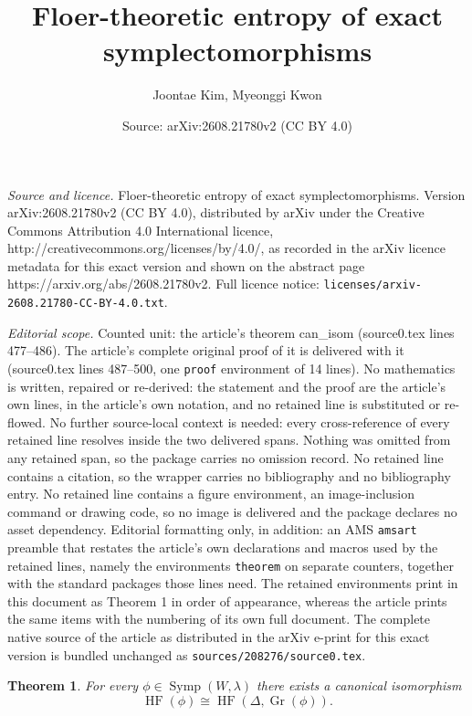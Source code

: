 \documentclass[10pt,a4paper]{amsart}
\title{Floer-theoretic entropy of exact symplectomorphisms}
\author{Joontae Kim, Myeonggi Kwon}
\date{Source: arXiv:2608.21780v2 (CC BY 4.0)}
\newtheorem{theorem}{Theorem}
\DeclareMathOperator{\Gr}{Gr}
\DeclareMathOperator{\HF}{HF}
\DeclareMathOperator{\Symp}{Symp}
\newcommand{\p}{\partial}
\begin{document}
\maketitle

\noindent\emph{Source and licence.} Floer-theoretic entropy of exact symplectomorphisms. Version arXiv:2608.21780v2 (CC BY 4.0), distributed by arXiv under the Creative Commons Attribution 4.0 International licence, http://creativecommons.org/licenses/by/4.0/, as recorded in the arXiv licence metadata for this exact version and shown on the abstract page https://arxiv.org/abs/2608.21780v2. Full licence notice: \texttt{licenses/arxiv-2608.21780-CC-BY-4.0.txt}.\par\smallskip

\noindent\textit{Editorial scope.} Counted unit: the article's theorem can\_isom (source0.tex lines 477--486). The article's complete original proof of it is delivered with it (source0.tex lines 487--500, one \texttt{proof} environment of 14 lines). No mathematics is written, repaired or re-derived: the statement and the proof are the article's own lines, in the article's own notation, and no retained line is substituted or re-flowed.  No further source-local context is needed: every cross-reference of every retained line resolves inside the two delivered spans.  Nothing was omitted from any retained span, so the package carries no omission record.  No retained line contains a citation, so the wrapper carries no bibliography and no bibliography entry.  No retained line contains a figure environment, an image-inclusion command or drawing code, so no image is delivered and the package declares no asset dependency.  Editorial formatting only, in addition: an AMS \texttt{amsart} preamble that restates the article's own declarations and macros used by the retained lines, namely the environments \texttt{theorem} on separate counters, together with the standard packages those lines need.  The retained environments print in this document as Theorem 1 in order of appearance, whereas the article prints the same items with the numbering of its own full document.  The complete native source of the article as distributed in the arXiv e-print for this exact version is bundled unchanged as \texttt{sources/208276/source0.tex}.
\begin{theorem}\label{thm: can_isom}
For every $\phi\in\Symp(W,\lambda)$ there exists a canonical isomorphism
$$
\HF(\phi)\cong \HF(\Delta,\Gr(\phi)).
$$
\end{theorem}
\end{document}
